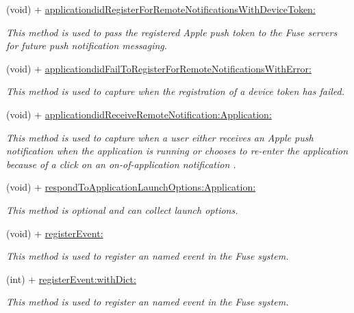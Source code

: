 \begin{DoxyCompactItemize}
(void) + \hyperlink{interface_fuse_a_p_i_a94479850c3b0c60887b96bb9cfa714e6}{applicationdid\+Register\+For\+Remote\+Notifications\+With\+Device\+Token\+:}
\begin{DoxyCompactList}\small\item\em This method is used to pass the registered Apple push token to the Fuse servers for future push notification messaging. \end{DoxyCompactList}\item 
(void) + \hyperlink{interface_fuse_a_p_i_ac3d0b5c1336b7a2883a6693fd4696ea0}{applicationdid\+Fail\+To\+Register\+For\+Remote\+Notifications\+With\+Error\+:}
\begin{DoxyCompactList}\small\item\em This method is used to capture when the registration of a device token has failed. \end{DoxyCompactList}\item 
(void) + \hyperlink{interface_fuse_a_p_i_a527313014384e35bf0537595295e1224}{applicationdid\+Receive\+Remote\+Notification\+:\+Application\+:}
\begin{DoxyCompactList}\small\item\em This method is used to capture when a user either receives an Apple push notification when the application is running or chooses to re-\/enter the application because of a click on an on-\/of-\/application notification . \end{DoxyCompactList}\item 
(void) + \hyperlink{interface_fuse_a_p_i_aa37c46cc4e49f09fd9b2b40a548b61fc}{respond\+To\+Application\+Launch\+Options\+:\+Application\+:}
\begin{DoxyCompactList}\small\item\em This method is optional and can collect launch options. \end{DoxyCompactList}\item 
(void) + \hyperlink{interface_fuse_a_p_i_a36deac5ef469d2f0e0b2f17fa2398a65}{register\+Event\+:}
\begin{DoxyCompactList}\small\item\em This method is used to register an named event in the Fuse system. \end{DoxyCompactList}\item 
(int) + \hyperlink{interface_fuse_a_p_i_ad5bc4fce3b1c795ca55beab32c9b600d}{register\+Event\+:with\+Dict\+:}
\begin{DoxyCompactList}\small\item\em This method is used to register an named event in the Fuse system. \end{DoxyCompactList}\item 

\end{DoxyCompactItemize}
